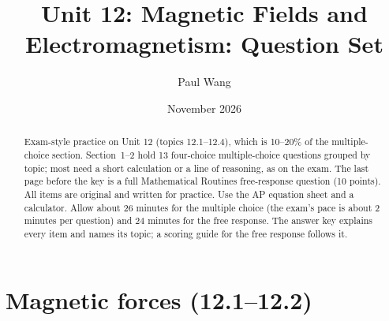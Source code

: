 \documentclass[11pt]{article}
\title{Unit 12: Magnetic Fields and Electromagnetism: Question Set}
\author{Paul Wang}
\date{November 2026}
\begin{document}
\maketitle

\begin{abstract}
Exam-style practice on Unit 12 (topics 12.1--12.4), which is 10--20\% of the multiple-choice section. Section~1--2 hold 13 four-choice multiple-choice questions grouped by topic; most need a short calculation or a line of reasoning, as on the exam. The last page before the key is a full Mathematical Routines free-response question (10 points). All items are original and written for practice. Use the AP equation sheet and a calculator. Allow about 26 minutes for the multiple choice (the exam's pace is about 2 minutes per question) and 24 minutes for the free response. The answer key explains every item and names its topic; a scoring guide for the free response follows it.
\end{abstract}


\section{Magnetic forces (12.1--12.2)}
\end{document}
